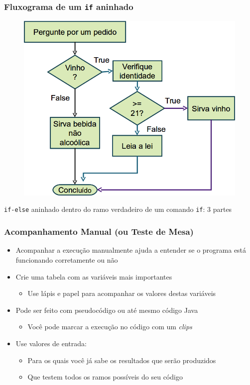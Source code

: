 \documentclass[xcolor={dvipsnames,table},aspectratio=169]{beamer}
\begin{document}
\begin{frame}\frametitle{Fluxograma de um \texttt{if} aninhado}
\begin{figure}[h]
	\includegraphics[height=0.65\paperheight,center]{pucrs-ep-fprog-unidade_03-decisoes-laminas-fluxograma_bebida.png}
\end{figure}
\begin{center}
{\tiny \texttt{if-else} aninhado dentro do ramo verdadeiro de um comando \texttt{if}: 3 partes}
\end{center}
\end{frame}

\begin{frame}\frametitle{Acompanhamento Manual (ou Teste de Mesa)}
\begin{itemize}
	\item Acompanhar a execução manualmente ajuda a entender se o programa está funcionando corretamente ou não
	\item Crie uma tabela com as variáveis mais importantes
	\begin{itemize}
		\item Use lápis e papel para acompanhar os valores destas variáveis
	\end{itemize}
	\item Pode ser feito com pseudocódigo ou até mesmo código Java
	\begin{itemize}
		\item Você pode marcar a execução no código com um \emph{clips}
	\end{itemize}
	\item Use valores de entrada:
	\begin{itemize}
		\item Para os quais você já sabe os resultados que serão produzidos
		\item Que testem todos os ramos possíveis do seu código 
	\end{itemize}
\end{itemize}
\end{frame}
\end{document}
